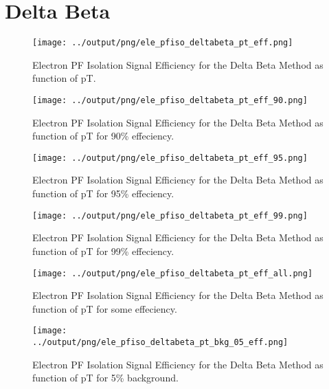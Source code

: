 \documentclass[11pt]{book}
\begin{document}
\section{Delta Beta}
\begin{figure}[htb]
\centering
\texttt{[image: ../output/png/ele\_pfiso\_deltabeta\_pt\_eff.png]}
\caption{Electron PF Isolation Signal Efficiency for the Delta Beta Method as function of pT.}
\label{fig:ele_pfiso_pt_eff_deltabeta}
\end{figure}

\begin{figure}[htb]
\centering
\texttt{[image: ../output/png/ele\_pfiso\_deltabeta\_pt\_eff\_90.png]}
\caption{Electron PF Isolation Signal Efficiency for the Delta Beta Method as function of pT for 90\% effeciency.}
\label{fig:ele_pfiso_pt_eff_deltabeta_eff_90}
\end{figure}

\begin{figure}[htb]
\centering
\texttt{[image: ../output/png/ele\_pfiso\_deltabeta\_pt\_eff\_95.png]}
\caption{Electron PF Isolation Signal Efficiency for the Delta Beta Method as function of pT for 95\% effeciency.}
\label{fig:ele_pfiso_pt_eff_deltabeta_eff_95}
\end{figure}

\begin{figure}[htb]
\centering
\texttt{[image: ../output/png/ele\_pfiso\_deltabeta\_pt\_eff\_99.png]}
\caption{Electron PF Isolation Signal Efficiency for the Delta Beta Method as function of pT for 99\% effeciency.}
\label{fig:ele_pfiso_pt_eff_deltabeta_eff_99}
\end{figure}

\begin{figure}[htb]
\centering
\texttt{[image: ../output/png/ele\_pfiso\_deltabeta\_pt\_eff\_all.png]}
\caption{Electron PF Isolation Signal Efficiency for the Delta Beta Method as function of pT for some effeciency.}
\label{fig:ele_pfiso_pt_eff_deltabeta_eff_all}
\end{figure}

\begin{figure}[htb]
\centering
\texttt{[image: ../output/png/ele\_pfiso\_deltabeta\_pt\_bkg\_05\_eff.png]}
\caption{Electron PF Isolation Signal Efficiency for the Delta Beta Method as function of pT for 5\% background.}
\label{fig:ele_pfiso_pt_bkg_deltabeta_bkg_05_eff}
\end{figure}
\end{document}
